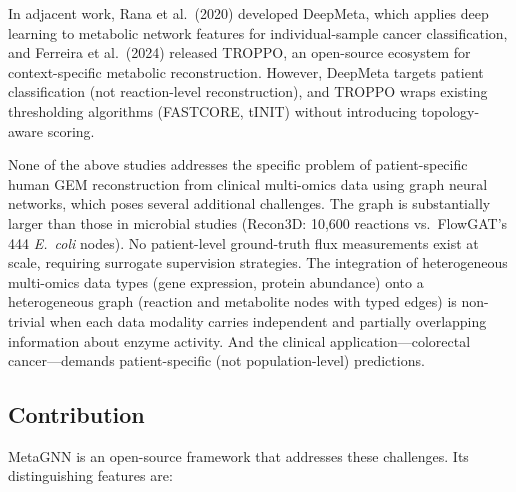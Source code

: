 \documentclass[12pt,a4paper]{article}
\begin{document}
In adjacent work, Rana et al.\ (2020) \cite{Rana2020} developed DeepMeta, which applies deep learning to metabolic network features for individual-sample cancer classification, and Ferreira et al.\ (2024) \cite{Ferreira2024} released TROPPO, an open-source ecosystem for context-specific metabolic reconstruction. However, DeepMeta targets patient classification (not reaction-level reconstruction), and TROPPO wraps existing thresholding algorithms (FASTCORE, tINIT) without introducing topology-aware scoring.

None of the above studies addresses the specific problem of patient-specific human GEM reconstruction from clinical multi-omics data using graph neural networks, which poses several additional challenges. The graph is substantially larger than those in microbial studies (Recon3D: 10,600 reactions vs.\ FlowGAT's 444 \textit{E.\ coli} nodes). No patient-level ground-truth flux measurements exist at scale, requiring surrogate supervision strategies. The integration of heterogeneous multi-omics data types (gene expression, protein abundance) onto a heterogeneous graph (reaction and metabolite nodes with typed edges) is non-trivial when each data modality carries independent and partially overlapping information about enzyme activity. And the clinical application---colorectal cancer---demands patient-specific (not population-level) predictions.

\subsection{Contribution}

MetaGNN is an open-source framework that addresses these challenges. Its distinguishing features are:
\end{document}
